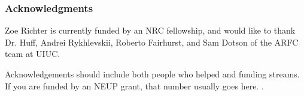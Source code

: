 \begin{frame}
  \frametitle{Acknowledgments}
        
	Zoe Richter is currently funded by an NRC fellowship, and would like to thank Dr. Huff, 	Andrei Rykhlevskii, Roberto Fairhurst, and Sam Dotson of the ARFC team at UIUC.

	Acknowledgements should include both people who helped and funding 
        streams. If you are funded by an NEUP grant, that number usually goes 
        here. .
\end{frame}

